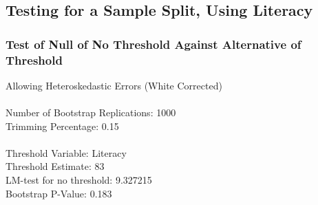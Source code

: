 \subsection{Testing for a Sample Split, Using Literacy} 
\subsubsection*{Test of Null of No Threshold Against Alternative of Threshold} 
Allowing Heteroskedastic Errors (White Corrected) \\\\
Number of Bootstrap Replications:  1000 \\
Trimming Percentage:               0.15 \\\\
Threshold Variable:                 Literacy \\
Threshold Estimate:                83 \\
LM-test for no threshold:          9.327215 \\
Bootstrap P-Value:                 0.183 \\

